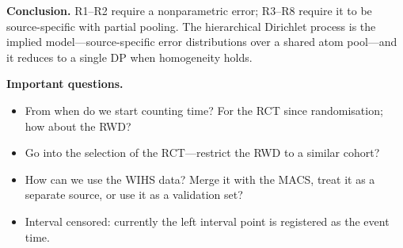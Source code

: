 \documentclass[11pt]{article}
\theoremstyle{plain}
\theoremstyle{definition}
\theoremstyle{remark}
\newcommand{\1}{\mathds{1}}
\begin{document}
\noindent\textbf{Conclusion.} R1--R2 require a nonparametric error; R3--R8
require it to be source-specific with partial pooling. The hierarchical
Dirichlet process is the implied model---source-specific error distributions
over a shared atom pool---and it reduces to a single DP when homogeneity holds.




\vspace{1cm}

\noindent\textbf{Important questions.}
\begin{itemize}
  \item From when do we start counting time? For the RCT since
    randomisation; how about the RWD?
  \item Go into the selection of the RCT---restrict the RWD to a
    similar cohort?
  \item How can we use the WIHS data? Merge it with the MACS, treat it
    as a separate source, or use it as a validation set?
  \item Interval censored: currently the left interval point is
    registered as the event time.
\end{itemize}

\newpage




\end{document}
